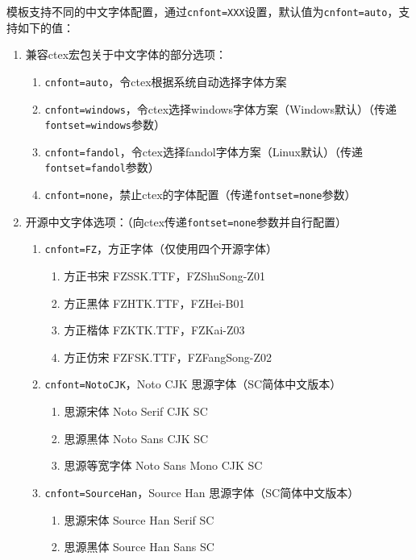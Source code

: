 \documentclass[lang=cn,10pt,cnfont=NotoCJK]{../simplebook}
\begin{document}
模板支持不同的中文字体配置，通过\lstinline{cnfont=XXX}设置，默认值为\lstinline{cnfont=auto}，支持如下的值：
\begin{enumerate}
    \item 兼容ctex宏包关于中文字体的部分选项：
          \begin{enumerate}
              \item \lstinline{cnfont=auto}，令ctex根据系统自动选择字体方案
              \item \lstinline{cnfont=windows}，令ctex选择windows字体方案（Windows默认）（传递\lstinline{fontset=windows}参数）
              \item \lstinline{cnfont=fandol}，令ctex选择fandol字体方案（Linux默认）（传递\lstinline{fontset=fandol}参数）
              \item \lstinline{cnfont=none}，禁止ctex的字体配置（传递\lstinline{fontset=none}参数）
          \end{enumerate}
    \item 开源中文字体选项：（向ctex传递\lstinline{fontset=none}参数并自行配置）
          \begin{enumerate}
              \item \lstinline{cnfont=FZ}，方正字体（仅使用四个开源字体）
                    \begin{enumerate}
                        \item 方正书宋 FZSSK.TTF，FZShuSong-Z01
                        \item 方正黑体 FZHTK.TTF，FZHei-B01
                        \item 方正楷体 FZKTK.TTF，FZKai-Z03
                        \item 方正仿宋 FZFSK.TTF，FZFangSong-Z02
                    \end{enumerate}
              \item \lstinline{cnfont=NotoCJK}，Noto CJK 思源字体（SC简体中文版本）
                    \begin{enumerate}
                        \item 思源宋体 Noto Serif CJK SC
                        \item 思源黑体 Noto Sans CJK SC
                        \item 思源等宽字体 Noto Sans Mono CJK SC
                    \end{enumerate}
              \item \lstinline{cnfont=SourceHan}，Source Han 思源字体（SC简体中文版本）
                    \begin{enumerate}
                        \item 思源宋体 Source Han Serif SC
                        \item 思源黑体 Source Han Sans SC
                    \end{enumerate}
          \end{enumerate}
\end{enumerate}
\end{document}

